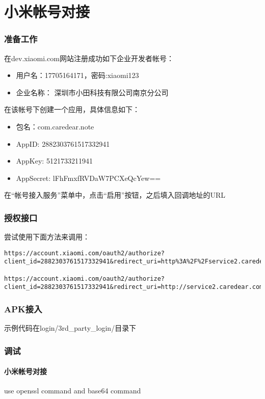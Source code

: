 \documentclass{beamer}
\begin{document}
\section{小米帐号对接}

\begin{frame}
\frametitle{准备工作}
在dev.xiaomi.com网站注册成功如下企业开发者帐号：
\begin{itemize}
 \item 用户名：17705164171，密码:xiaomi123
 \item 企业名称： 深圳市小田科技有限公司南京分公司
\end{itemize}

在该帐号下创建一个应用，具体信息如下：
\begin{itemize}
 \item 包名：com.caredear.note
 \item AppID: 2882303761517332941
 \item AppKey: 5121733211941
 \item AppSecret: lFhFmxfRVDaW7PCXeQcYew==
\end{itemize}

在“帐号接入服务”菜单中，点击“启用”按钮，之后填入回调地址的URL

\end{frame}

\begin{frame}[fragile]
\frametitle{授权接口}


尝试使用下面方法来调用：
\begin{lstlisting}
https://account.xiaomi.com/oauth2/authorize?client_id=2882303761517332941&redirect_uri=http%3A%2F%2Fservice2.caredear.com%2Fv1%2Fuc%2Fxiaomiaccount&response_type=token&userId=861457562

https://account.xiaomi.com/oauth2/authorize?client_id=2882303761517332941&redirect_uri=http://service2.caredear.com/v1/uc/xiaomiaccount&response_type=token
\end{lstlisting}


\end{frame}

\begin{frame}
\frametitle{APK接入}

示例代码在login/3rd\_party\_login/目录下

\end{frame}

\begin{frame}
\frametitle{调试}
  \framesubtitle{小米帐号对接}
  use openssl command and base64 command

\end{frame}
\end{document}
